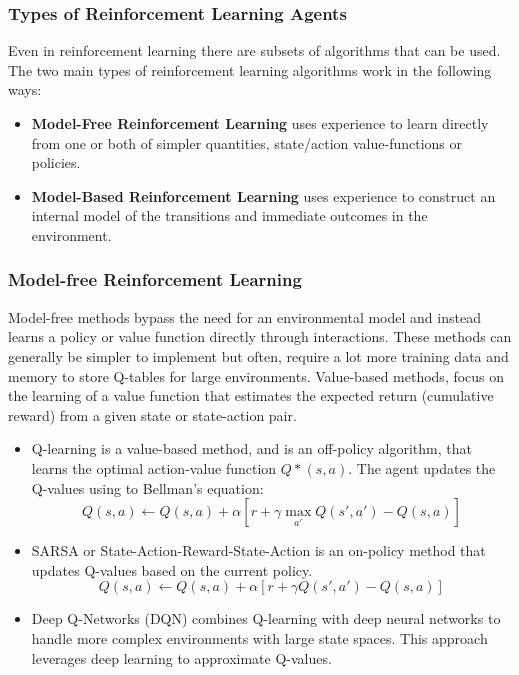 \subsubsection{Types of Reinforcement Learning Agents}
Even in reinforcement learning there are subsets of algorithms that can be used. The two main types of reinforcement learning algorithms work in the following ways:
\begin{itemize}
      \item \textbf{Model-Free Reinforcement Learning} uses experience to learn directly from one or both of simpler quantities, state/action value-functions or policies. %
      \item \textbf{Model-Based Reinforcement Learning} uses experience to construct an internal model of the transitions and immediate outcomes in the environment.
\end{itemize}

\subsubsection{Model-free Reinforcement Learning}
Model-free methods bypass the need for an environmental model and instead
learns a policy or value function directly through interactions. These methods
can generally be simpler to implement but often, require a lot more training data 
and memory to store Q-tables for large environments.
Value-based methods, focus on the learning of a value function that estimates 
the expected return (cumulative reward) from a given state or state-action pair.
\begin{itemize}
      \item Q-learning is a value-based method, and is an off-policy algorithm,
      that learns the optimal action-value function \(Q*(s,a) \). The agent updates the 
      Q-values using to Bellman's equation: \cite{Types-of-Reinforcement-Learning}
      \begin{equation}
            Q(s,a) \leftarrow Q(s,a) + \alpha [r + \gamma \max_{a'} Q(s',a') - Q(s,a)]
      \end{equation}
      \item SARSA or State-Action-Reward-State-Action is an on-policy method that 
      updates Q-values based on the current policy. \cite{SARSA}
      \begin{equation}
            Q(s,a) \leftarrow Q(s,a) + \alpha [r + \gamma Q(s',a') - Q(s,a)]
      \end{equation}
      \item Deep Q-Networks (DQN) combines Q-learning with deep neural networks 
      to handle more complex environments with large state spaces. This approach leverages deep learning 
      to approximate Q-values. \cite{Types-of-Reinforcement-Learning}
\end{itemize}

